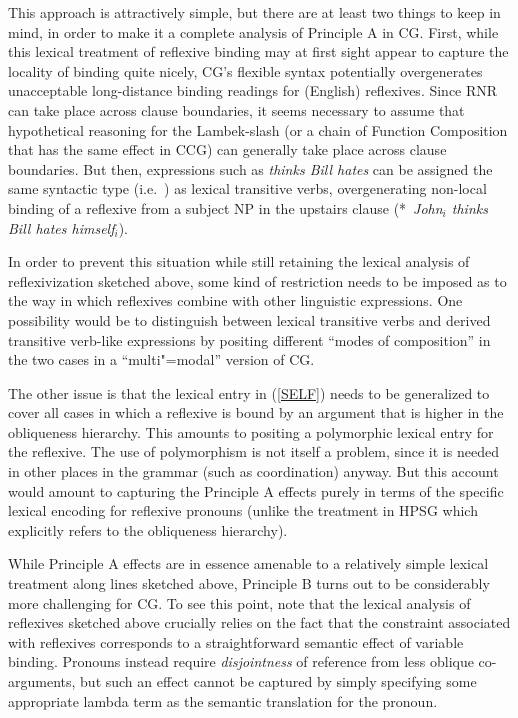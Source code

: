 \documentclass[output=paper
                ,modfonts
                ,nonflat
	        ,collection
	        ,collectionchapter
	        ,collectiontoclongg
 	        ,biblatex
                ,babelshorthands
                ,newtxmath
                ,draftmode
                ,colorlinks, citecolor=brown
]{./langsci/langscibook}
\begin{document}
This approach is attractively simple, but there are at least two
things to keep in mind, in order to make it a complete analysis of
Principle A in CG. First, while this 
lexical treatment of reflexive binding may at first sight 
appear to capture the locality of binding quite nicely, CG's flexible
syntax potentially overgenerates unacceptable long-distance binding
readings for (English) reflexives. Since RNR can take
place across clause boundaries,  it seems necessary to
assume that hypothetical reasoning for the Lambek-slash
(or a chain of Function Composition that has the same effect in CCG)
can generally take place across clause boundaries. But then,
expressions such as \textit{thinks Bill hates} can be assigned
the same syntactic type (i.e.\  ) as lexical transitive verbs,
overgenerating non-local binding of a reflexive from a subject NP in
the upstairs clause (*~\textit{John\ensuremath{_i} thinks Bill hates {himself\ensuremath{_i}}}).

In order to prevent this situation while still retaining the lexical
analysis of reflexivization sketched above, some kind of restriction
needs to be imposed as to the way in which reflexives combine with
other linguistic expressions. One possibility would be to distinguish
between lexical transitive verbs and derived transitive verb-like
expressions by positing different ``modes of composition'' in the two
cases in a ``multi"=modal'' version of CG.

The other issue is that the lexical entry in (\ref{SELF}) needs to be
generalized to cover all cases in which a reflexive is bound by an
argument that is higher in the obliqueness hierarchy. This amounts to
positing a polymorphic lexical entry for the reflexive. The use of
polymorphism is not itself a problem, since it is needed in other
places in the grammar (such as coordination) anyway. But this account
would amount to capturing the Principle A effects purely in terms of the 
specific lexical encoding for reflexive pronouns (unlike the treatment
in HPSG which explicitly refers to the obliqueness hierarchy).

While Principle A effects are in essence amenable to a 
relatively simple lexical treatment along lines sketched above, Principle B turns out to be
considerably more challenging for CG. To see this point, note that the
lexical analysis of reflexives sketched above crucially relies on the
fact that the constraint associated with reflexives corresponds to a
straightforward semantic effect of variable binding. Pronouns instead
require \emph{disjointness} of reference from less oblique co-arguments, but
such an effect cannot be captured by simply specifying some
appropriate lambda term as the semantic translation for the pronoun.
\end{document}
